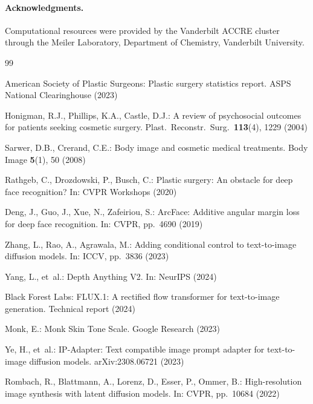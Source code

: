 \documentclass[twocolumn]{article}
\begin{document}
\paragraph{Acknowledgments.}
Computational resources were provided by the Vanderbilt ACCRE cluster
through the Meiler Laboratory, Department of Chemistry, Vanderbilt
University.



\begin{thebibliography}{99}

American Society of Plastic Surgeons:
Plastic surgery statistics report.
ASPS National Clearinghouse (2023)

Honigman, R.J., Phillips, K.A., Castle, D.J.:
A review of psychosocial outcomes for patients seeking cosmetic surgery.
Plast.\ Reconstr.\ Surg.\ \textbf{113}(4), 1229 (2004)

Sarwer, D.B., Crerand, C.E.:
Body image and cosmetic medical treatments.
Body Image \textbf{5}(1), 50 (2008)

Rathgeb, C., Drozdowski, P., Busch, C.:
Plastic surgery: An obstacle for deep face recognition?
In: CVPR Workshops (2020)

Deng, J., Guo, J., Xue, N., Zafeiriou, S.:
ArcFace: Additive angular margin loss for deep face recognition.
In: CVPR, pp.~4690 (2019)

Zhang, L., Rao, A., Agrawala, M.:
Adding conditional control to text-to-image diffusion models.
In: ICCV, pp.~3836 (2023)

Yang, L., et~al.:
Depth Anything V2.
In: NeurIPS (2024)

Black Forest Labs:
FLUX.1: A rectified flow transformer for text-to-image generation.
Technical report (2024)

Monk, E.:
Monk Skin Tone Scale.
Google Research (2023)

Ye, H., et~al.:
IP-Adapter: Text compatible image prompt adapter for text-to-image diffusion
models.
arXiv:2308.06721 (2023)

Rombach, R., Blattmann, A., Lorenz, D., Esser, P., Ommer, B.:
High-resolution image synthesis with latent diffusion models.
In: CVPR, pp.~10684 (2022)


\end{thebibliography}
\end{document}
